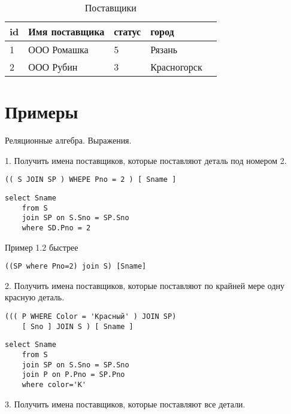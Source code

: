 \begin{table}[ht]
	\centering
	\begin{tabular}{ | l | l | l | l |l |}
		\hline
		id & Имя поставщика & статус & город       \\ \hline
		1  & ООО Ромашка    & 5      & Рязань      \\ \hline
		2  & ООО Рубин      & 3      & Красногорск \\ \hline
		\hline
	\end{tabular}
	\caption{Поставщики}
	\label{table:ref1}
\end{table}

\section{Примеры}

Реляционные алгебра. Выражения.

1. Получить имена поставщиков, которые поставляют деталь под номером 2.

\begin{lstlisting}[label=some-code,caption=Пример 1]
	(( S JOIN SP ) WНEPE Рno = 2 ) [ Sname ]
\end{lstlisting}

\begin{lstlisting}[label=some-code,caption=Пример 1]
	select Sname
	from S
	join SP on S.Sno = SP.Sno
	where SD.Pno = 2
\end{lstlisting}

Пример 1.2 быстрее

\begin{lstlisting}[label=some-code,caption=Пример 1.2]
	((SP where Pno=2) join S) [Sname]
\end{lstlisting}


2. Получить имена поставщиков, которые поставляют по крайней мере одну красную деталь.

\begin{lstlisting}[label=some-code,caption=Пример 2]
	((( Р WНERE Color = 'Красный' ) JOIN SP) 
	[ Sno ] JOIN S ) [ Sname ]
\end{lstlisting}


\begin{lstlisting}[label=some-code,caption=Пример 2]
	select Sname
	from S
	join SP on S.Sno = SP.Sno
	join P on P.Pno = SP.Pno
	where color='К'
\end{lstlisting}


3. Получить имена поставщиков, которые поставляют все детали.

